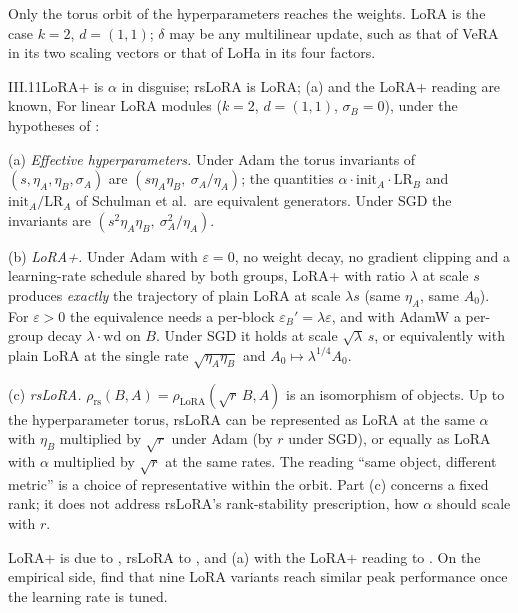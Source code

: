 \begin{explains}
Only the torus orbit of the hyperparameters reaches the weights. LoRA is the case $k=2$, $d=(1,1)$; $\delta$ may be any
multilinear update, such as that of VeRA \citep{kopiczko2023vera} in its two scaling vectors or that of LoHa
\citep{hyeonwoo2021fedpara} in its four factors.
\end{explains}

\begin{corollary}{III.11}{LoRA+ is $\alpha$ in disguise; rsLoRA is LoRA; (a) and the LoRA+ reading are known, \citet{schulman2025lora}}
For linear LoRA modules ($k=2$, $d=(1,1)$, $\sigma_B=0$), under the hypotheses of :

(a) \emph{Effective hyperparameters.} Under Adam the torus invariants of $(s,\eta_A,\eta_B,\sigma_A)$ are
$(s\eta_A\eta_B,\ \sigma_A/\eta_A)$; the quantities $\alpha\cdot\mathrm{init}_A\cdot\mathrm{LR}_B$ and
$\mathrm{init}_A/\mathrm{LR}_A$ of Schulman et al.\ are equivalent generators. Under SGD the invariants are
$(s^2\eta_A\eta_B,\ \sigma_A^2/\eta_A)$.

(b) \emph{LoRA+.} Under Adam with $\varepsilon=0$, no weight decay, no gradient clipping and a learning-rate schedule
shared by both groups, LoRA+ with ratio $\lambda$ at scale $s$ produces \emph{exactly} the trajectory of plain LoRA at
scale $\lambda s$ (same $\eta_A$, same $A_0$). For $\varepsilon>0$ the equivalence needs a per-block
$\varepsilon_B'=\lambda\varepsilon$, and with AdamW a per-group decay $\lambda\cdot\mathrm{wd}$ on $B$. Under SGD it
holds at scale $\sqrt\lambda\,s$, or equivalently with plain LoRA at the single rate $\sqrt{\eta_A\eta_B}$ and
$A_0\mapsto\lambda^{1/4}A_0$.

(c) \emph{rsLoRA.} $\rho_{\mathrm{rs}}(B,A)=\rho_{\mathrm{LoRA}}(\sqrt r\,B,A)$ is an isomorphism of objects. Up to the
hyperparameter torus, rsLoRA can be represented as LoRA at the same $\alpha$ with $\eta_B$ multiplied by $\sqrt r$ under
Adam (by $r$ under SGD), or equally as LoRA with $\alpha$ multiplied by $\sqrt r$ at the same rates. The reading ``same
object, different metric'' is a choice of representative within the orbit. Part (c) concerns a fixed rank; it does not
address rsLoRA's rank-stability prescription, how $\alpha$ should scale with $r$.
\end{corollary}

LoRA+ is due to \citet{hayou2024lora}, rsLoRA to \citet{kalajdzievski2023rank}, and (a) with the LoRA+ reading to
\citet{schulman2025lora}. On the empirical side, \citet{lee2026learning} find that nine LoRA variants reach similar peak
performance once the learning rate is tuned.

